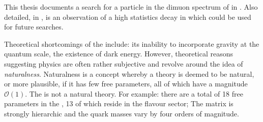 This thesis documents a search for a \np particle in the dimuon spectrum of \btokstrmumu in
.
Also detailed, in , is an observation of a high statistics \fcnc decay in
 which could be used for future \np searches.












Theoretical shortcomings of the \sm include: its inability to incorporate gravity at the quantum
scale, the existence of dark energy.
However, theoretical reasons suggesting \bsm physics
are often rather subjective and revolve around the idea of \emph{naturalness}.
Naturalness is a concept whereby a theory is deemed to be natural, or more plausible, if it has few
free parameters, all of which have a magnitude $\mathcal{O}(1)$.
The \sm is not a natural theory.
For example: there are a total of 18 free parameters in the \sm, 13 of which reside in the flavour
sector;
The \ckm matrix is strongly hierarchic
and the quark masses vary by four orders of magnitude.

